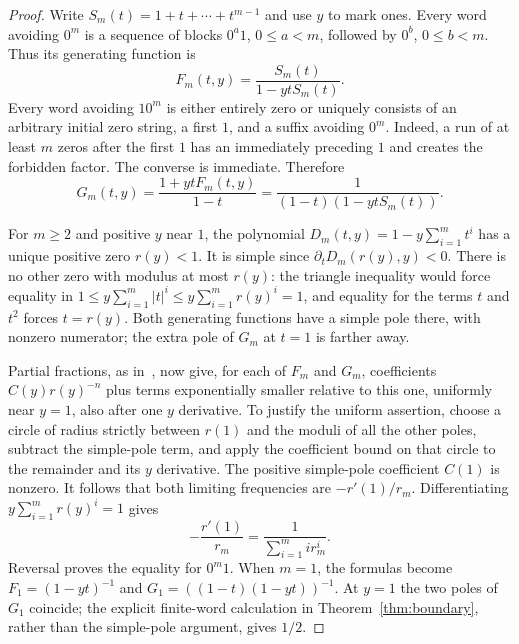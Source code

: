 \documentclass[11pt]{article}
\begin{document}
\begin{proof}
Write $S_m(t)=1+t+\cdots+t^{m-1}$ and use $y$ to mark ones.
Every word avoiding $0^m$ is a sequence of blocks $0^a1$,
$0\leq a<m$, followed by $0^b$, $0\leq b<m$. Thus its generating function is
\[
 F_m(t,y)=\frac{S_m(t)}{1-ytS_m(t)}.
\]
Every word avoiding $10^m$ is either entirely zero or uniquely consists
of an arbitrary initial zero string, a first $1$, and a suffix avoiding $0^m$.
Indeed, a run of at least $m$ zeros after the first $1$ has an immediately
preceding $1$ and creates the forbidden factor. The converse is immediate.
Therefore
\[
 G_m(t,y)=\frac{1+ytF_m(t,y)}{1-t}
 =\frac{1}{(1-t)(1-ytS_m(t))}.
\]

For $m\geq2$ and positive $y$ near $1$, the polynomial
$D_m(t,y)=1-y\sum_{i=1}^m t^i$ has a unique positive zero $r(y)<1$.
It is simple since $\partial_tD_m(r(y),y)<0$.
There is no other zero with modulus at most $r(y)$: the triangle inequality
would force equality in
$1\leq y\sum_{i=1}^m |t|^i\leq y\sum_{i=1}^m r(y)^i=1$,
and equality for the terms $t$ and $t^2$ forces $t=r(y)$.
Both generating functions have a simple pole there, with nonzero numerator;
the extra pole of $G_m$ at $t=1$ is farther away.

Partial fractions, as in~\cite[Theorem~IV.9, p.~256]{FS}, now give,
for each of $F_m$ and $G_m$, coefficients
$C(y)r(y)^{-n}$ plus terms exponentially smaller relative to this one,
uniformly near $y=1$, also after one $y$ derivative.
To justify the uniform assertion, choose a circle of radius strictly between
$r(1)$ and the moduli of all the other poles, subtract the simple-pole term,
and apply the coefficient bound on that circle to the remainder and its
$y$ derivative. The positive simple-pole coefficient $C(1)$ is nonzero.
It follows that both limiting frequencies are $-r'(1)/r_m$.
Differentiating $y\sum_{i=1}^m r(y)^i=1$ gives
\[
 -\frac{r'(1)}{r_m}=\frac{1}{\sum_{i=1}^m i r_m^i}.
\]
Reversal proves the equality for $0^m1$.
When $m=1$, the formulas become $F_1=(1-yt)^{-1}$ and
$G_1=((1-t)(1-yt))^{-1}$. At $y=1$ the two poles of $G_1$ coincide;
the explicit finite-word calculation in Theorem~\ref{thm:boundary}, rather
than the simple-pole argument, gives $1/2$.
\end{proof}
\end{document}
